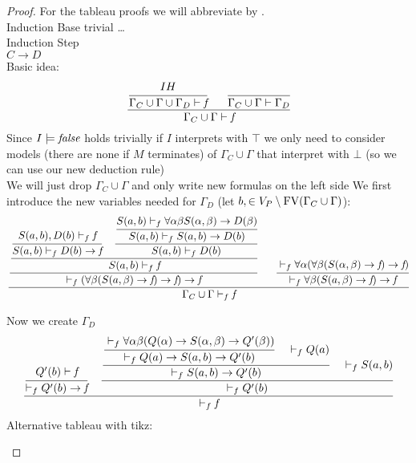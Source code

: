 \begin{proof}
For the tableau proofs we will abbreviate \false{} by \falses.\\
Induction Base trivial \dots\\
Induction Step\\
$C\to D$\\
Basic idea:\\
$$
\cfrac
{\cfrac{IH}{\Gamma_C\cup\Gamma\cup\Gamma_D\vdash\emph{f}}\hspace{0.6cm}
\cfrac{}{\Gamma_C\cup\Gamma\vdash\Gamma_D}}
{\Gamma_C\cup\Gamma\vdash\emph{f}}
$$
Since $I\models\emph{false}$ holds trivially if $I$ interprets \false{} with $\top$ we only need to consider models (there are none if $M$ terminates) of $\Gamma_C\cup\Gamma$ that interpret \false{} with $\bot$ (so we can use our new deduction rule)\\
We will just drop $\Gamma_C\cup\Gamma$ and only write new formulas on the left side
We first introduce the new variables needed for $\Gamma_D$ (let $b,\in V_P\setminus\text{FV}(\Gamma_C\cup\Gamma)$):
$$\cfrac
{\cfrac{\cfrac{\cfrac{S(a,b),D(b)\vdashf\falses}
                     {S(a,b)\vdashf D(b)\to\falses}
               \hspace{0.4cm}
               \cfrac{\cfrac{S(a,b)\vdashf \forall\alpha\beta S(\alpha,\beta)\to D(\beta)}
                            {S(a,b)\vdashf S(a,b)\to D(b)}} %
                     {S(a,b)\vdashf D(b)}}
              {S(a,b)\vdashf\falses}}
       {\vdashf(\forall\beta(S(a,\beta)\to\falses)\to\falses)\to\falses}
 \hspace{0.6cm}
 \cfrac{\vdashf\forall\alpha(\forall\beta(S(\alpha,\beta)\to\falses)\to\falses)}
       {\vdashf\forall\beta(S(a,\beta)\to\falses)\to\falses}}
{\Gamma_C\cup\Gamma\vdashf\falses}
$$

Now we create $\Gamma_D$ 
$$\cfrac{\cfrac{Q'(b)\vdash\emph{f}}
               {\vdash_f Q'(b)\to\emph{f}}
\hspace{0.4cm}
\cfrac{\cfrac{\cfrac{\vdash_f \forall\alpha\beta(Q(\alpha)\to S(\alpha,\beta)\to Q'(\beta))}
                    {\vdash_f Q(a)\to S(a,b)\to Q'(b)}
              \hspace{0.4cm}
              \vdash_f Q(a)}
             {\vdash_f S(a,b)\to Q'(b)}
       \hspace{0.4cm}
       \vdash_f S(a,b)}
      {\vdash_f Q'(b)}}
{\vdash_f \emph{f}}$$
Alternative tableau with tikz:
\begin{figure}[H]
\end{figure}
\end{proof}
